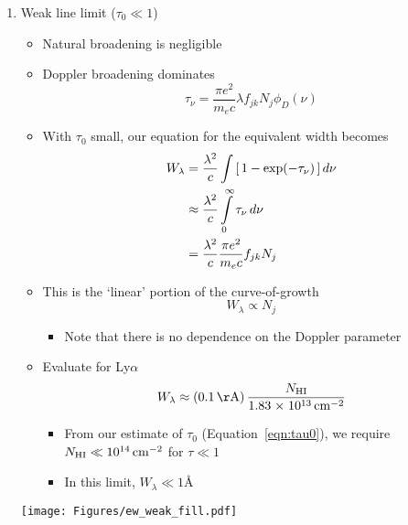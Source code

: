 \documentclass[12pt,letterpaper]{article}
\begin{document}
\begin{Aenumerate}
\begin{itemize}
 \begin{enumerate}
  \item Weak line limit ($\tau_0 \ll 1$)
	\begin{itemize}
	\item Natural broadening is negligible
	\item Doppler broadening dominates
	\begin{equation}
	\tau_\nu = \frac{\pi e^2}{m_e c} \lambda f_{jk} N_j \phi_D(\nu) 
	\end{equation}
	\item With $\tau_0$ small, our equation for the equivalent width becomes
	\begin{align}
	W_\lambda &= \frac{\lambda^2}{c} \int \left [ \, 1 - \exp(-\tau_\nu) \, \right ] d\nu \\
		& \approx \frac{\lambda^2}{c} \int\limits_0^\infty \tau_\nu \, d\nu \\
		& = \frac{\lambda^2}{c} \frac{\pi e^2}{m_e c} f_{jk} N_j 
	\end{align}
	\item This is the `linear' portion of the curve-of-growth
	\begin{equation}
	W_\lambda \propto N_j
	\end{equation}
		\begin{itemize}
		\item Note that there is no dependence on the Doppler parameter
		\end{itemize}
	\item Evaluate for Ly$\alpha$
	\begin{equation}
	W_\lambda \approx (0.1 \, {\rm \AA}) \, \frac{N_{\rm HI}}{1.83 \sci{13} \cm{-2}} 
	\end{equation}
		\begin{itemize}
		\item From our estimate of $\tau_0$ (Equation~\ref{eqn:tau0}), 
		we require $N_{\rm HI} \ll 10^{14} \, {\rm cm^{-2}}$ for $\tau \ll 1$
		\item In this limit, $W_\lambda \ll 1$\AA
		\end{itemize}
	\end{itemize}

	\texttt{[image: Figures/ew\_weak\_fill.pdf]}


\end{enumerate}
\end{itemize}
\end{Aenumerate}
\end{document}
